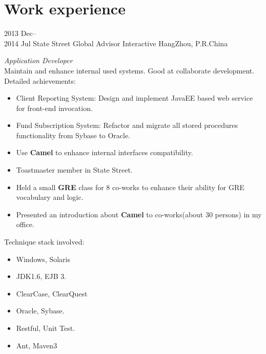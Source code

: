 \documentclass[]{friggeri-cv} %
\begin{document}
\section{Work experience}
\begin{entrylist}
\entry
{2013 Dec--\\ 2014 Jul}
{State Street Global Advisor Interactive}
{HangZhou, P.R.China}
{\emph{Application Developer} \\
Maintain and enhance internal used systems. Good at collaborate development.\\
Detailed achievements:
\begin{itemize}
\item Client Reporting System: Design and implement JavaEE based web service for front-end invocation.
\item Fund Subscription System: Refactor and migrate all stored procedures functionality from Sybase to Oracle.
\item Use \textbf{Camel} to enhance internal interfaces compatibility.
\item Toastmaster member in State Street.
\item Held a small \textbf{GRE} class for 8 co-works to enhance their ability for GRE vocabulary and logic.
\item Presented an introduction about \textbf{Camel} to co-works(about 30 persons) in my office.
\end{itemize}
Technique stack involved:
\begin{itemize}
	\item Windows, Solaris
	\item JDK1.6, EJB 3.
	\item ClearCase, ClearQuest
	\item Oracle, Sybase.
	\item Restful, Unit Test.
	\item Ant, Maven3

\end{itemize}
}
\end{entrylist}
\newpage
\end{document}
